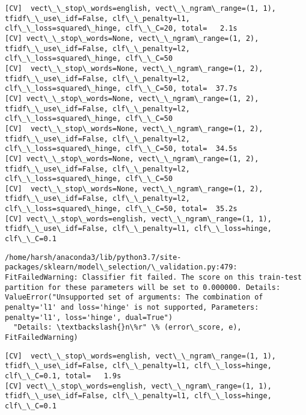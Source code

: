 \documentclass[11pt]{article}
\begin{document}
    \begin{Verbatim}[commandchars=\\\{\}]
[CV]  vect\_\_stop\_words=english, vect\_\_ngram\_range=(1, 1), tfidf\_\_use\_idf=False, clf\_\_penalty=l1, clf\_\_loss=squared\_hinge, clf\_\_C=20, total=   2.1s
[CV] vect\_\_stop\_words=None, vect\_\_ngram\_range=(1, 2), tfidf\_\_use\_idf=False, clf\_\_penalty=l2, clf\_\_loss=squared\_hinge, clf\_\_C=50 
[CV]  vect\_\_stop\_words=None, vect\_\_ngram\_range=(1, 2), tfidf\_\_use\_idf=False, clf\_\_penalty=l2, clf\_\_loss=squared\_hinge, clf\_\_C=50, total=  37.7s
[CV] vect\_\_stop\_words=None, vect\_\_ngram\_range=(1, 2), tfidf\_\_use\_idf=False, clf\_\_penalty=l2, clf\_\_loss=squared\_hinge, clf\_\_C=50 
[CV]  vect\_\_stop\_words=None, vect\_\_ngram\_range=(1, 2), tfidf\_\_use\_idf=False, clf\_\_penalty=l2, clf\_\_loss=squared\_hinge, clf\_\_C=50, total=  34.5s
[CV] vect\_\_stop\_words=None, vect\_\_ngram\_range=(1, 2), tfidf\_\_use\_idf=False, clf\_\_penalty=l2, clf\_\_loss=squared\_hinge, clf\_\_C=50 
[CV]  vect\_\_stop\_words=None, vect\_\_ngram\_range=(1, 2), tfidf\_\_use\_idf=False, clf\_\_penalty=l2, clf\_\_loss=squared\_hinge, clf\_\_C=50, total=  35.2s
[CV] vect\_\_stop\_words=english, vect\_\_ngram\_range=(1, 1), tfidf\_\_use\_idf=False, clf\_\_penalty=l1, clf\_\_loss=hinge, clf\_\_C=0.1 

    \end{Verbatim}

    \begin{Verbatim}[commandchars=\\\{\}]
/home/harsh/anaconda3/lib/python3.7/site-packages/sklearn/model\_selection/\_validation.py:479: FitFailedWarning: Classifier fit failed. The score on this train-test partition for these parameters will be set to 0.000000. Details: 
ValueError("Unsupported set of arguments: The combination of penalty='l1' and loss='hinge' is not supported, Parameters: penalty='l1', loss='hinge', dual=True")
  "Details: \textbackslash{}n\%r" \% (error\_score, e), FitFailedWarning)

    \end{Verbatim}

    \begin{Verbatim}[commandchars=\\\{\}]
[CV]  vect\_\_stop\_words=english, vect\_\_ngram\_range=(1, 1), tfidf\_\_use\_idf=False, clf\_\_penalty=l1, clf\_\_loss=hinge, clf\_\_C=0.1, total=   1.9s
[CV] vect\_\_stop\_words=english, vect\_\_ngram\_range=(1, 1), tfidf\_\_use\_idf=False, clf\_\_penalty=l1, clf\_\_loss=hinge, clf\_\_C=0.1 

    \end{Verbatim}
\end{document}
